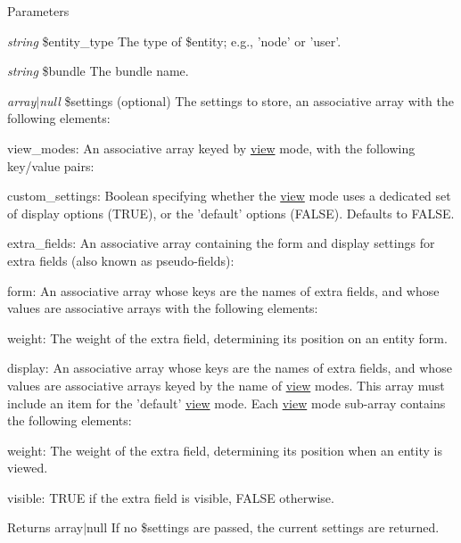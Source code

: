\begin{DoxyParams}{Parameters}
\item[{\em string}]\$entity\_\-type The type of \$entity; e.g., 'node' or 'user'. \item[{\em string}]\$bundle The bundle name. \item[{\em array$|$null}]\$settings (optional) The settings to store, an associative array with the following elements:
\begin{DoxyItemize}
\item view\_\-modes: An associative array keyed by \hyperlink{classview}{view} mode, with the following key/value pairs:
\begin{DoxyItemize}
\item custom\_\-settings: Boolean specifying whether the \hyperlink{classview}{view} mode uses a dedicated set of display options (TRUE), or the 'default' options (FALSE). Defaults to FALSE.
\end{DoxyItemize}
\item extra\_\-fields: An associative array containing the form and display settings for extra fields (also known as pseudo-\/fields):
\begin{DoxyItemize}
\item form: An associative array whose keys are the names of extra fields, and whose values are associative arrays with the following elements:
\begin{DoxyItemize}
\item weight: The weight of the extra field, determining its position on an entity form.
\end{DoxyItemize}
\item display: An associative array whose keys are the names of extra fields, and whose values are associative arrays keyed by the name of \hyperlink{classview}{view} modes. This array must include an item for the 'default' \hyperlink{classview}{view} mode. Each \hyperlink{classview}{view} mode sub-\/array contains the following elements:
\begin{DoxyItemize}
\item weight: The weight of the extra field, determining its position when an entity is viewed.
\item visible: TRUE if the extra field is visible, FALSE otherwise.
\end{DoxyItemize}
\end{DoxyItemize}
\end{DoxyItemize}\end{DoxyParams}
\begin{DoxyReturn}{Returns}
array$|$null If no \$settings are passed, the current settings are returned. 
\end{DoxyReturn}

